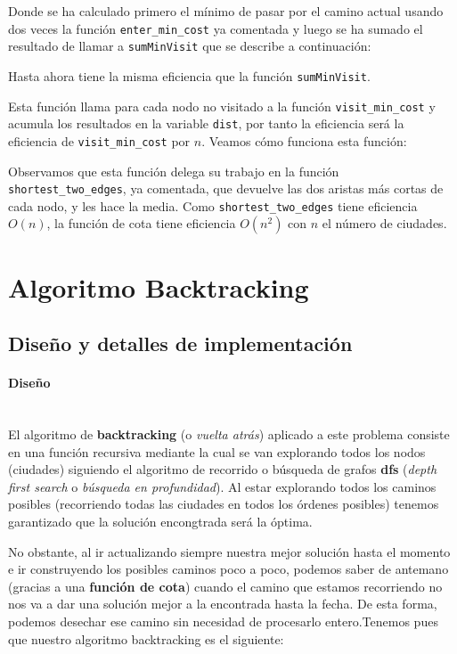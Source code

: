 \documentclass{article}
\newcommand{\myparagraph}[1]{\paragraph{#1}\mbox{}\\}
\begin{document}


Donde se ha calculado primero el mínimo de pasar por el camino actual usando dos veces la función \verb|enter_min_cost| ya comentada y luego se ha sumado el resultado de llamar a \verb|sumMinVisit| que se describe a continuación:



Hasta ahora tiene la misma eficiencia que la función \verb|sumMinVisit|. 

Esta función llama para cada nodo no visitado a la función \verb|visit_min_cost| y acumula los resultados en la variable \verb|dist|, por tanto la eficiencia será la eficiencia de \verb|visit_min_cost| por $n$. Veamos cómo funciona esta función:



Observamos que esta función delega su trabajo en la función \verb|shortest_two_edges|, ya comentada, que devuelve las dos aristas más cortas de cada nodo, y les hace la media. Como \verb|shortest_two_edges| tiene eficiencia $O(n)$, la función de cota tiene eficiencia $O(n^2)$ con $n$ el número de ciudades.

\newpage

\section{Algoritmo Backtracking}
\subsection{Diseño y detalles de implementación}

\myparagraph{Diseño}

El algoritmo de \textbf{backtracking} (o \textit{vuelta atrás}) aplicado a este problema consiste en una función recursiva mediante la cual se van explorando todos los nodos (ciudades) siguiendo el algoritmo de recorrido o búsqueda de grafos \textbf{dfs} (\textit{depth first search} o \textit{búsqueda en profundidad}). Al estar explorando todos los caminos posibles (recorriendo todas las ciudades en todos los órdenes posibles) tenemos garantizado que la solución encongtrada será la óptima. 

No obstante,
al ir actualizando siempre nuestra mejor solución hasta el momento e ir construyendo los posibles caminos poco a poco, podemos saber de antemano (gracias a una \textbf{función de cota}) cuando el camino que estamos recorriendo no nos va a dar una solución mejor a la encontrada hasta la fecha. De esta forma, podemos desechar ese camino sin necesidad de procesarlo entero.Tenemos pues que nuestro algoritmo backtracking es el siguiente:
\end{document}
